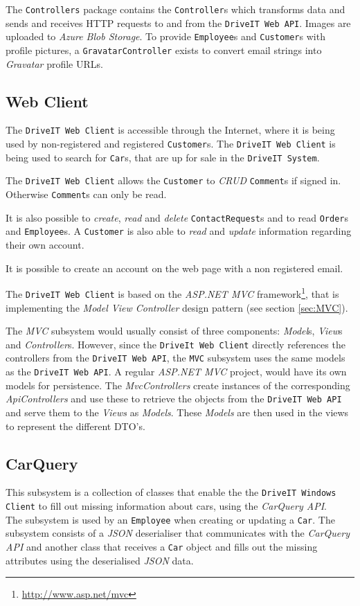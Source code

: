 The \texttt{Controllers} package contains the \texttt{Controller}s which transforms data and sends and receives HTTP requests to and from the \texttt{DriveIT Web API}. Images are uploaded to \textit{Azure Blob Storage}. To provide \texttt{Employee}s and \texttt{Customer}s with profile pictures, a \texttt{GravatarController} exists to convert email strings into \textit{Gravatar} profile URLs.

\subsection{Web Client}
The \texttt{DriveIT Web Client} is accessible through the Internet, where it is being used by non-registered and registered \texttt{Customer}s. The \texttt{DriveIT Web Client} is being used to search for \texttt{Car}s, that are up for sale in the \texttt{DriveIT System}.

The \texttt{DriveIT Web Client} allows the \texttt{Customer} to \textit{CRUD} \texttt{Comment}s if signed in. Otherwise \texttt{Comment}s can only be read.

It is also possible to \textit{create}, \textit{read} and \textit{delete} \texttt{ContactRequest}s and to read \texttt{Order}s and \texttt{Employee}s. A \texttt{Customer} is also able to \textit{read} and \textit{update} information regarding their own account.

It is possible to create an account on the web page with a non registered email.

The \texttt{DriveIT Web Client} is based on the \textit{ASP.NET MVC} framework\footnote{\url{http://www.asp.net/mvc}}, that is implementing the \textit{Model View Controller} design pattern (see section \ref{sec:MVC}).

The \textit{MVC} subsystem would usually consist of three components: \textit{Model}s, \textit{View}s and \textit{Controller}s. However, since the \texttt{DriveIt Web Client} directly references the controllers from the \texttt{DriveIT Web API}, the \texttt{MVC} subsystem uses the same models as the \texttt{DriveIT Web API}. A regular \textit{ASP.NET MVC} project, would have its own models for persistence. The \textit{MvcControllers} create instances of the corresponding \textit{ApiControllers} and use these to retrieve the objects from the \texttt{DriveIT Web API} and serve them to the \textit{Views} as \textit{Models}. These \textit{Models} are then used in the views to represent the different DTO's.

\subsection{CarQuery} 
This subsystem is a collection of classes that enable the the \texttt{DriveIT Windows Client} to fill out missing information about cars, using the \textit{CarQuery API}.\\
The subsystem is used by an \texttt{Employee} when creating or updating a \texttt{Car}. The subsystem consists of a \textit{JSON} deserialiser that communicates with the \textit{CarQuery API} and another class that receives a \texttt{Car} object and fills out the missing attributes using the deserialised \textit{JSON} data.


